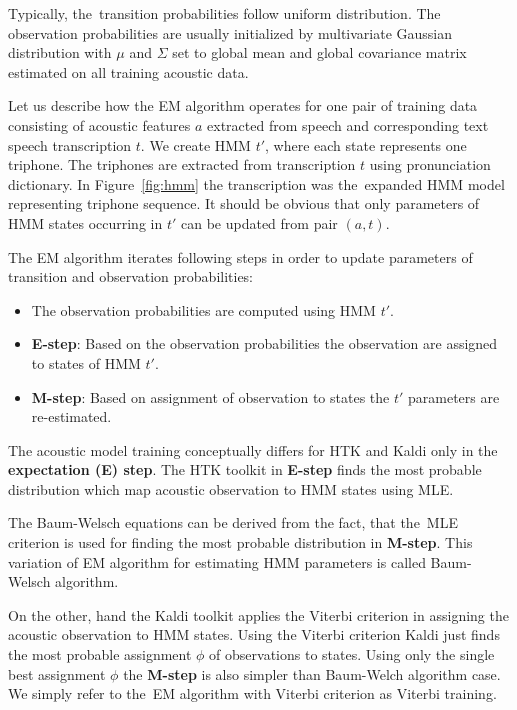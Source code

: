 {Typically, the~transition probabilities follow uniform distribution.
The observation probabilities are usually initialized by multivariate Gaussian distribution
with $\mu$ and $\Sigma$ set to global mean and global covariance matrix 
estimated on all training acoustic data.

Let us describe how the \ac{EM} algorithm operates for one pair
of training data consisting of acoustic features $a$ extracted from speech
and corresponding text speech transcription $t$.
We create \ac{HMM} $t'$, where each state represents one triphone. 
The triphones are extracted from transcription $t$ using pronunciation dictionary.
In Figure~\ref{fig:hmm} the transcription  
was the~expanded \ac{HMM} model representing triphone sequence.
It should be obvious that only parameters of HMM states 
occurring in $t'$ can be updated from pair $(a, t)$.

The \ac{EM} algorithm iterates following steps in order 
to update parameters of transition and observation probabilities:
\begin{itemize}
    \item The observation probabilities are computed using \ac{HMM} $t'$. 
    \item {\bf E-step}: Based on the observation probabilities the observation are assigned to states of \ac{HMM} $t'$. 
    \item {\bf M-step}: Based on assignment of observation to states the $t'$ parameters are re-estimated. 
\end{itemize}

The acoustic model training conceptually differs for \ac{HTK} and Kaldi only in the {\bf expectation (E) step}.
The \ac{HTK} toolkit in {\bf E-step} finds the most probable distribution 
which map acoustic observation to \ac{HMM} states using \ac{MLE}\cite{gopinath1998maximum}.


The Baum-Welsch equations can be derived from the fact, 
that the~\ac{MLE} criterion is used for finding the most probable distribution in {\bf M-step}.\cite{huang2001spoken}
This variation of \ac{EM} algorithm for estimating \ac{HMM} parameters is called Baum-Welsch algorithm.

On the other, hand the Kaldi toolkit applies the Viterbi 
criterion in assigning the acoustic observation to \ac{HMM} states.
Using the Viterbi criterion Kaldi just finds 
the most probable assignment $\phi$ of observations to states.\cite{buthpitiya2012parallel}
Using only the single best assignment $\phi$ the {\bf M-step} is also simpler than
Baum-Welch algorithm case.
We simply refer to the~\ac{EM} algorithm with Viterbi criterion as Viterbi training.

}
